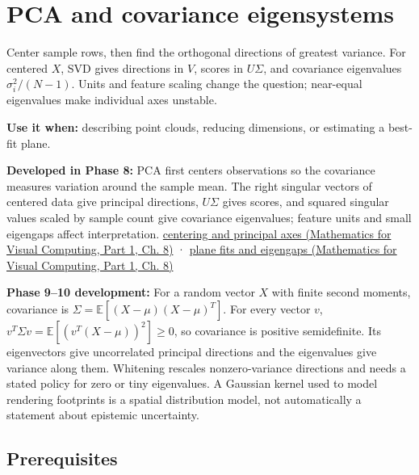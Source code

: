 \hypertarget{appendix-ad175ef3c5bf}{}\label{referencestart:appendix-ad175ef3c5bf}
\section{PCA and covariance eigensystems}\label{appendix-ad175ef3c5bf-pca-and-covariance-eigensystems}

\hypertarget{appendix-ad175ef3c5bf-pca-and-covariance-eigensystems}{}

Center sample rows, then find the orthogonal directions of greatest variance. For centered \(X\), SVD gives directions in \(V\), scores in \(U\Sigma\), and covariance eigenvalues \(\sigma_i^2/(N-1)\). Units and feature scaling change the question; near-equal eigenvalues make individual axes unstable.

\textbf{Use it when:} describing point clouds, reducing dimensions, or estimating a best-fit plane.

\textbf{Developed in Phase 8:} PCA first centers observations so the covariance measures variation around the sample mean. The right singular vectors of centered data give principal directions, \(U\Sigma\) gives scores, and squared singular values scaled by sample count give covariance eigenvalues; feature units and small eigengaps affect interpretation. \href{../02-Mathematics-for-Visual-Computing-P01/main.pdf\#02-foundations-ii-ch024-centered-measurements-reveal-principal-directions}{centering and principal axes (Mathematics for Visual Computing, Part 1, Ch. 8)} · \href{../02-Mathematics-for-Visual-Computing-P01/main.pdf\#02-foundations-ii-ch024-plane-fits-eigengaps-and-interpretation-of-uncertain-components}{plane fits and eigengaps (Mathematics for Visual Computing, Part 1, Ch. 8)}

\textbf{Phase 9--10 development:} For a random vector \(X\) with finite second moments, covariance is \(\Sigma=\mathbb E[(X-\mu)(X-\mu)^T]\). For every vector \(v\), \(v^T\Sigma v=\mathbb E[(v^T(X-\mu))^2]\geq0\), so covariance is positive semidefinite. Its eigenvectors give uncorrelated principal directions and the eigenvalues give variance along them. Whitening rescales nonzero-variance directions and needs a stated policy for zero or tiny eigenvalues. A Gaussian kernel used to model rendering footprints is a spatial distribution model, not automatically a statement about epistemic uncertainty.

\subsection{Prerequisites}\label{appendix-ad175ef3c5bf-prerequisites}


